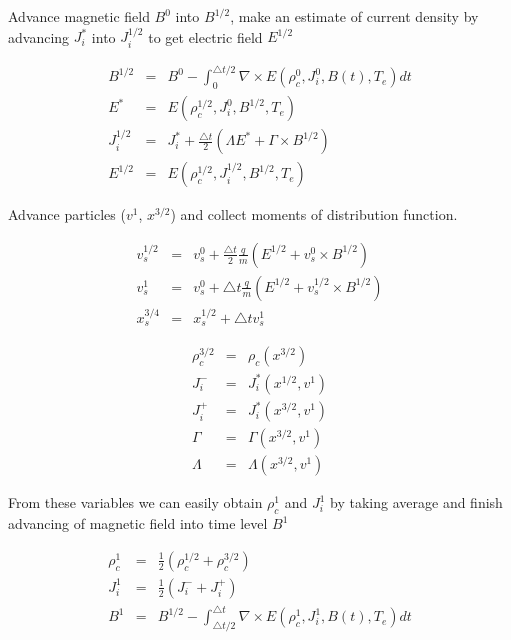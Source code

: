 \documentclass[oneside,branding,toc,article]{sat}
\begin{document}
Advance magnetic field $B^0$ into $B^{1/2}$, make an estimate of current
density by advancing $J_i^*$ into $J_i^{1/2}$ to get electric field $E^{1/2}$

\begin{eqnarray}
  \label{eq:step1}
  B^{1/2} & = & B^0 - \int_0^{\triangle t/2} \nabla \times E(\rho_c^0, J_i^0,
  B(t), T_e) dt \nonumber \\
  E^* & = & E(\rho_c^{1/2}, J_i^0, B^{1/2}, T_e) \nonumber \\
  J_i^{1/2} & = & J_i^* + \frac{\triangle t}{2}(\Lambda E^* + \Gamma
  \times B^{1/2}) \nonumber \\
  E^{1/2} & = & E(\rho_c^{1/2}, J_i^{1/2}, B^{1/2}, T_e) \nonumber
\end{eqnarray}

Advance particles ($v^1$, $x^{3/2}$) and collect moments of distribution
function.

\begin{eqnarray}
  \label{eq:step2a}
  v_s^{1/2} & = & v_s^{0} + \frac{\triangle t}{2} \frac{q}{m}
  (E^{1/2} + v_s^{0} \times B^{1/2}) \nonumber \\
  v_s^{1} & = & v_s^{0} + \triangle t \frac{q}{m}(E^{1/2} + v_s^{1/2} \times
  B^{1/2}) \nonumber \\
  x_s^{3/4} & = & x_s^{1/2} + \triangle t v_s^{1} \nonumber
\end{eqnarray}

\begin{eqnarray}
  \label{eq:step2b}
  \rho_c^{3/2} & = & \rho_c (x^{3/2}) \nonumber \\
  J_i^- & = & J_i^* (x^{1/2}, v^1) \nonumber \\
  J_i^+ & = & J_i^* (x^{3/2}, v^1) \nonumber \\
  \Gamma & = & \Gamma (x^{3/2}, v^1) \nonumber \\
  \Lambda & = & \Lambda (x^{3/2}, v^1) \nonumber
\end{eqnarray}

From these variables we can easily obtain $\rho_c^{1}$ and $J_i^{1}$ by taking
average and finish advancing of magnetic field into time level $B^1$

\begin{eqnarray}
  \label{eq:step2b}
  \rho_c^{1} & = & \frac{1}{2} (\rho_c^{1/2} + \rho_c^{3/2}) \nonumber \\
  J_i^{1} & = & \frac{1}{2} (J_i^- + J_i^+) \nonumber \\
  B^{1} & = & B^{1/2} - \int_{\triangle t/2}^{\triangle t} \nabla \times
  E(\rho_c^{1}, J_i^1, B(t), T_e) dt \nonumber
\end{eqnarray}
\end{document}

